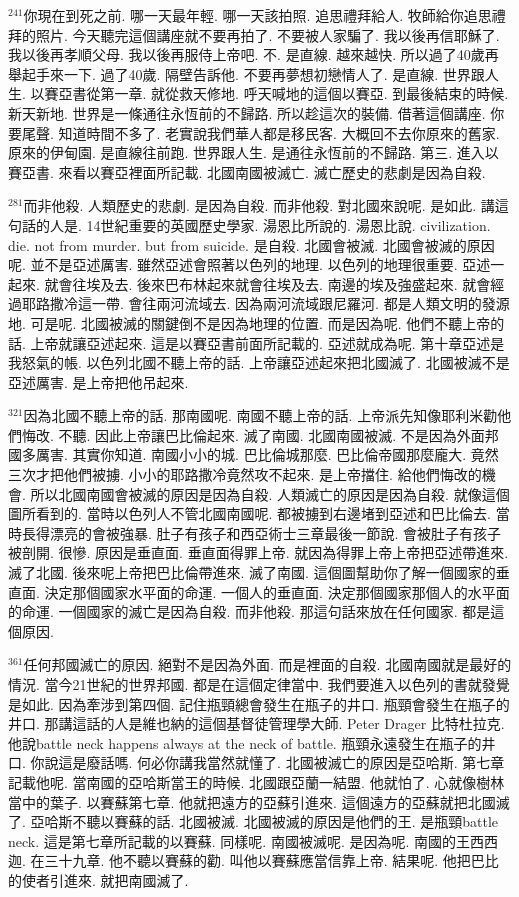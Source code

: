 \documentclass{book}
\begin{document}
$^{241}$你現在到死之前.
哪一天最年輕.
哪一天該拍照.
追思禮拜給人.
牧師給你追思禮拜的照片.
今天聽完這個講座就不要再拍了.
不要被人家騙了.
我以後再信耶穌了.
我以後再孝順父母.
我以後再服侍上帝吧.
不.
是直線.
越來越快.
所以過了40歲再舉起手來一下.
過了40歲.
隔壁告訴他.
不要再夢想初戀情人了.
是直線.
世界跟人生.
以賽亞書從第一章.
就從救天修地.
呼天喊地的這個以賽亞.
到最後結束的時候.
新天新地.
世界是一條通往永恆前的不歸路.
所以趁這次的裝備.
借著這個講座.
你要尾聲.
知道時間不多了.
老實說我們華人都是移民客.
大概回不去你原來的舊家.
原來的伊甸園.
是直線往前跑.
世界跟人生.
是通往永恆前的不歸路.
第三.
進入以賽亞書.
來看以賽亞裡面所記載.
北國南國被滅亡.
滅亡歷史的悲劇是因為自殺.

$^{281}$而非他殺.
人類歷史的悲劇.
是因為自殺.
而非他殺.
對北國來說呢.
是如此.
講這句話的人是.
14世紀重要的英國歷史學家.
湯恩比所說的.
湯恩比說.
civilization.
die.
not from murder.
but from suicide.
是自殺.
北國會被滅.
北國會被滅的原因呢.
並不是亞述厲害.
雖然亞述會照著以色列的地理.
以色列的地理很重要.
亞述一起來.
就會往埃及去.
後來巴布林起來就會往埃及去.
南邊的埃及強盛起來.
就會經過耶路撒冷這一帶.
會往兩河流域去.
因為兩河流域跟尼羅河.
都是人類文明的發源地.
可是呢.
北國被滅的關鍵倒不是因為地理的位置.
而是因為呢.
他們不聽上帝的話.
上帝就讓亞述起來.
這是以賽亞書前面所記載的.
亞述就成為呢.
第十章亞述是我怒氣的帳.
以色列北國不聽上帝的話.
上帝讓亞述起來把北國滅了.
北國被滅不是亞述厲害.
是上帝把他吊起來.

$^{321}$因為北國不聽上帝的話.
那南國呢.
南國不聽上帝的話.
上帝派先知像耶利米勸他們悔改.
不聽.
因此上帝讓巴比倫起來.
滅了南國.
北國南國被滅.
不是因為外面邦國多厲害.
其實你知道.
南國小小的城.
巴比倫城那麼.
巴比倫帝國那麼龐大.
竟然三次才把他們被擄.
小小的耶路撒冷竟然攻不起來.
是上帝擋住.
給他們悔改的機會.
所以北國南國會被滅的原因是因為自殺.
人類滅亡的原因是因為自殺.
就像這個圖所看到的.
當時以色列人不管北國南國呢.
都被擄到右邊堵到亞述和巴比倫去.
當時長得漂亮的會被強暴.
肚子有孩子和西亞術士三章最後一節說.
會被肚子有孩子被剖開.
很慘.
原因是垂直面.
垂直面得罪上帝.
就因為得罪上帝上帝把亞述帶進來.
滅了北國.
後來呢上帝把巴比倫帶進來.
滅了南國.
這個圖幫助你了解一個國家的垂直面.
決定那個國家水平面的命運.
一個人的垂直面.
決定那個國家那個人的水平面的命運.
一個國家的滅亡是因為自殺.
而非他殺.
那這句話來放在任何國家.
都是這個原因.

$^{361}$任何邦國滅亡的原因.
絕對不是因為外面.
而是裡面的自殺.
北國南國就是最好的情況.
當今21世紀的世界邦國.
都是在這個定律當中.
我們要進入以色列的書就發覺是如此.
因為牽涉到第四個.
記住瓶頸總會發生在瓶子的井口.
瓶頸會發生在瓶子的井口.
那講這話的人是維也納的這個基督徒管理學大師.
Peter Drager 比特杜拉克.
他說battle neck happens always at the neck of battle.
瓶頸永遠發生在瓶子的井口.
你說這是廢話嗎.
何必你講我當然就懂了.
北國被滅亡的原因是亞哈斯.
第七章記載他呢.
當南國的亞哈斯當王的時候.
北國跟亞蘭一結盟.
他就怕了.
心就像樹林當中的葉子.
以賽蘇第七章.
他就把遠方的亞蘇引進來.
這個遠方的亞蘇就把北國滅了.
亞哈斯不聽以賽蘇的話.
北國被滅.
北國被滅的原因是他們的王.
是瓶頸battle neck.
這是第七章所記載的以賽蘇.
同樣呢.
南國被滅呢.
是因為呢.
南國的王西西迦.
在三十九章.
他不聽以賽蘇的勸.
叫他以賽蘇應當信靠上帝.
結果呢.
他把巴比的使者引進來.
就把南國滅了.
\end{document}
